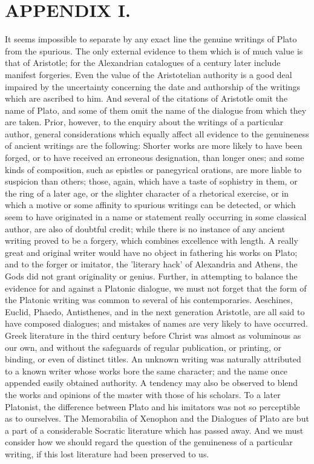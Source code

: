\documentclass[11pt,letter]{article}
\begin{document}
\section{
      APPENDIX I.
    }
\par  It seems impossible to separate by any exact line the genuine writings of Plato from the spurious. The only external evidence to them which is of much value is that of Aristotle; for the Alexandrian catalogues of a century later include manifest forgeries. Even the value of the Aristotelian authority is a good deal impaired by the uncertainty concerning the date and authorship of the writings which are ascribed to him. And several of the citations of Aristotle omit the name of Plato, and some of them omit the name of the dialogue from which they are taken. Prior, however, to the enquiry about the writings of a particular author, general considerations which equally affect all evidence to the genuineness of ancient writings are the following: Shorter works are more likely to have been forged, or to have received an erroneous designation, than longer ones; and some kinds of composition, such as epistles or panegyrical orations, are more liable to suspicion than others; those, again, which have a taste of sophistry in them, or the ring of a later age, or the slighter character of a rhetorical exercise, or in which a motive or some affinity to spurious writings can be detected, or which seem to have originated in a name or statement really occurring in some classical author, are also of doubtful credit; while there is no instance of any ancient writing proved to be a forgery, which combines excellence with length. A really great and original writer would have no object in fathering his works on Plato; and to the forger or imitator, the 'literary hack' of Alexandria and Athens, the Gods did not grant originality or genius. Further, in attempting to balance the evidence for and against a Platonic dialogue, we must not forget that the form of the Platonic writing was common to several of his contemporaries. Aeschines, Euclid, Phaedo, Antisthenes, and in the next generation Aristotle, are all said to have composed dialogues; and mistakes of names are very likely to have occurred. Greek literature in the third century before Christ was almost as voluminous as our own, and without the safeguards of regular publication, or printing, or binding, or even of distinct titles. An unknown writing was naturally attributed to a known writer whose works bore the same character; and the name once appended easily obtained authority. A tendency may also be observed to blend the works and opinions of the master with those of his scholars. To a later Platonist, the difference between Plato and his imitators was not so perceptible as to ourselves. The Memorabilia of Xenophon and the Dialogues of Plato are but a part of a considerable Socratic literature which has passed away. And we must consider how we should regard the question of the genuineness of a particular writing, if this lost literature had been preserved to us.
\end{document}
